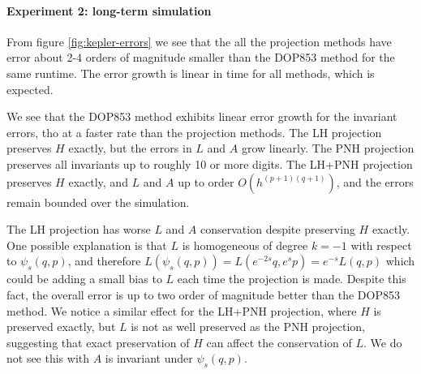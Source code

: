 \documentclass[final,3p,times]{elsarticle}
\begin{document}


\paragraph{Experiment 2: long-term simulation} From figure \ref{fig:kepler-errors} we see that the all the projection methods have error about 2-4 orders of magnitude smaller than the DOP853 method for the same runtime. The error growth is linear in time for all methods, which is expected.

We see that the DOP853 method exhibits linear error growth for the invariant errors, tho at a faster rate than the projection methods. The LH projection preserves $H$ exactly, but the errors in $L$ and $A$ grow linearly. The PNH projection preserves all invariants up to roughly 10 or more digits. The LH+PNH projection preserves $H$ exactly, and $L$ and $A$ up to order $O(h^{(p+1)(q+1)})$, and the errors remain bounded over the simulation. 

The LH projection has worse $L$ and $A$ conservation despite preserving $H$ exactly. One possible explanation is that $L$ is homogeneous of degree $k=-1$ with respect to $\psi_s(q,p)$, and therefore $L(\psi_s(q,p))= L(e^{-2s}q, e^{s}p) = e^{-s}L(q,p)$ which could be adding a small bias to $L$ each time the projection is made. Despite this fact, the overall error is up to two order of magnitude better than the DOP853 method. We notice a similar effect for the LH+PNH projection, where $H$ is preserved exactly, but $L$ is not as well preserved as the PNH projection, suggesting that exact preservation of $H$ can affect the conservation of $L$. We do not see this with $A$ is invariant under $\psi_s(q,p)$. 
\end{document}
